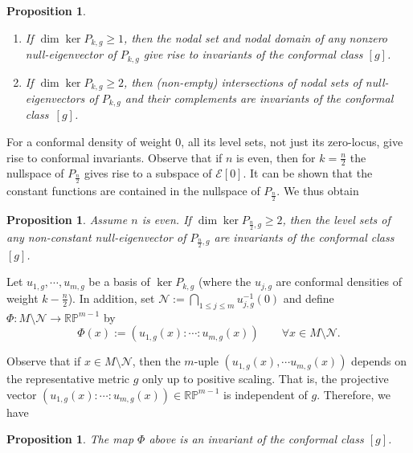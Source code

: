 \documentclass{amsart}
\newtheorem{proposition}[theorem]{Proposition}
\theoremstyle{definition}
\theoremstyle{remark}
\begin{document}
\begin{proposition}\label{prop:nodal-sets-Pk}~     
\begin{enumerate}
        \item If $\dim \ker P_{k,g}\geq 1$, then the nodal set and
          nodal domain of any nonzero null-eigenvector of $P_{k,g}$ give rise to invariants of the conformal class
          $[g]$.
    
        \item If $\dim \ker P_{k,g}\geq 2$, then (non-empty)
          intersections of nodal sets of null-eigenvectors of
          $P_{k,g}$ and their complements are invariants of the
          conformal class~$[g]$.
    \end{enumerate}
\end{proposition}

For a conformal density of weight $0$, all its level sets, not just
its zero-locus, give rise to conformal invariants. Observe that if $n$
is even, then for $k=\frac{n}{2}$ the nullspace of $P_{\frac{n}{2}}$
gives rise to a subspace of ${{\mathcal{E}}}[0]$. It can be shown that the constant functions are contained in the nullspace of 
$P_{\frac{n}{2}}$. We thus obtain

\begin{proposition}
  Assume $n$ is even. If $\dim \ker P_{\frac{n}{2},g}\geq 2$, then the
  level sets of any non-constant null-eigenvector of $P_{\frac{n}{2},g}$ are invariants of the conformal class $[g]$.
\end{proposition}

Let $u_{1,g}, \cdots, u_{m,g}$ be a basis of $\ker P_{k,g}$ (where 
the $u_{j,g}$ are conformal densities of weight $k-\frac{n}{2}$). In addition, set  ${{\mathcal{N}}}:= \bigcap_{1\leq j \leq m} 
u_{j,g}^{-1}(0)$ and define $\Phi:M\setminus {{\mathcal{N}}} \rightarrow {{\mathbb{R}}}{{\mathbb P}}^{m-1}$ by 
\begin{equation*}
    \Phi(x):=(u_{1,g}(x): \cdots :u_{m,g}(x)) \qquad \forall x \in M\setminus {{\mathcal{N}}}. 
\end{equation*}

Observe that if $x\in M\setminus 
{{\mathcal{N}}}$, then the $m$-uple $(u_{1,g}(x), \cdots u_{m,g}(x))$ depends on the representative metric $g$ only up to positive 
scaling. That is, the projective vector $(u_{1,g}(x): \cdots :u_{m,g}(x))\in {{\mathbb{R}}}{{\mathbb P}}^{m-1}$ is independent of $g$. 
Therefore, we have

\begin{proposition}\label{prop:embedding-Phi}
   The map $\Phi$ above is an invariant of the conformal class $[g]$. 
\end{proposition}
\end{document}
